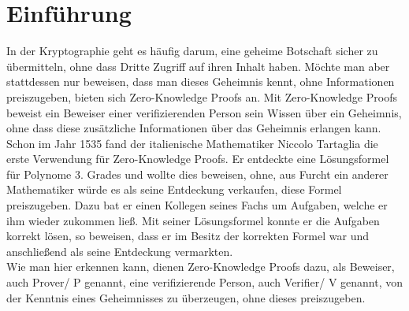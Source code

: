 \documentclass {article}
\begin{document}
\newpage

\tableofcontents

\newpage 

\section{Einf\"uhrung}

In der Kryptographie geht es häufig darum, eine geheime Botschaft sicher zu übermitteln, ohne dass Dritte Zugriff auf ihren Inhalt haben. Möchte man aber stattdessen nur beweisen, dass man dieses Geheimnis kennt, ohne Informationen preiszugeben, bieten sich Zero-Knowledge Proofs an. Mit Zero-Knowledge Proofs beweist ein Beweiser einer verifizierenden Person sein Wissen über ein Geheimnis, ohne dass diese zusätzliche Informationen über das Geheimnis erlangen kann.
\\

Schon im Jahr 1535 fand der italienische Mathematiker Niccolo Tartaglia die erste Verwendung für Zero-Knowledge Proofs\cite{BSW}. Er entdeckte eine Lösungsformel für Polynome 3. Grades und wollte dies beweisen, ohne, aus Furcht ein anderer Mathematiker würde es als seine Entdeckung verkaufen, diese Formel preiszugeben. Dazu bat er einen Kollegen seines Fachs um Aufgaben, welche er ihm wieder zukommen lie\ss{}. Mit seiner L\"osungsformel konnte er die Aufgaben korrekt l\"osen, so beweisen, dass er im Besitz der korrekten Formel war und anschlie\ss{}end als seine Entdeckung vermarkten. \\

Wie man hier erkennen kann, dienen Zero-Knowledge Proofs dazu, als Beweiser, auch Prover/ P genannt, eine
verifizierende Person, auch Verifier/ V genannt, von der Kenntnis eines Geheimnisses zu überzeugen, ohne dieses preiszugeben. \\ 
\end{document}
